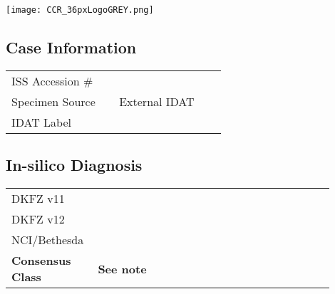 \documentclass[
	letterpaper, %
	11pt, %
]{CSSullivanBusinessReport}
\begin{document}

\thispagestyle{empty} %

\vspace*{-0.075\textheight} %

\hspace*{-0.5cm}\texttt{[image: CCR\_36pxLogoGREY.png]} %

{\fontsize{18pt}{20pt}\selectfont\raggedright\textbf{\reporttitle}\par} %

{\textit{\textbf{\reportsubtitle}}\par} %

{\reportdate\par} %

\subsection*{Case Information}

\begin{tabular}{@{} L{0.3\linewidth} L{0.3\linewidth} @{}} %
	\toprule
	ISS Accession \# & \\
	Specimen Source & External IDAT\\
	IDAT Label & \\
	\bottomrule
\end{tabular}

\subsection*{In-silico Diagnosis}
\begin{tabular}{@{} L{0.2\linewidth} L{0.5\linewidth} L{0.2\linewidth} @{}} %
	\toprule
	DKFZ v11 &  & \\
	DKFZ v12 &  & \\
	NCI/Bethesda &  & \\
	\textbf{Consensus Class} & \textbf{See note}\\
	\bottomrule
\end{tabular}
\end{document}
